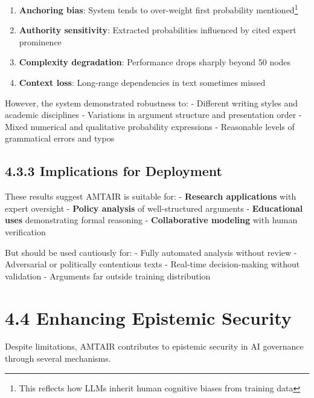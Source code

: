 \documentclass[
  11pt,
  letterpaper,
]{book}
\providecommand{\tightlist}{%
  \setlength{\itemsep}{0pt}\setlength{\parskip}{0pt}}
\begin{document}
\begin{enumerate}
\def\labelenumi{\arabic{enumi}.}
\tightlist
\item
  \textbf{Anchoring bias}: System tends to over-weight first probability
  mentioned\footnote{This reflects how LLMs inherit human cognitive
    biases from training data}
\item
  \textbf{Authority sensitivity}: Extracted probabilities influenced by
  cited expert prominence
\item
  \textbf{Complexity degradation}: Performance drops sharply beyond 50
  nodes
\item
  \textbf{Context loss}: Long-range dependencies in text sometimes
  missed
\end{enumerate}

However, the system demonstrated robustness to: - Different writing
styles and academic disciplines - Variations in argument structure and
presentation order - Mixed numerical and qualitative probability
expressions - Reasonable levels of grammatical errors and typos

\subsection*{4.3.3 Implications for
Deployment}\label{sec-deployment-implications}

These results suggest AMTAIR is suitable for: - \textbf{Research
applications} with expert oversight - \textbf{Policy analysis} of
well-structured arguments - \textbf{Educational uses} demonstrating
formal reasoning - \textbf{Collaborative modeling} with human
verification

But should be used cautiously for: - Fully automated analysis without
review - Adversarial or politically contentious texts - Real-time
decision-making without validation - Arguments far outside training
distribution

\section*{4.4 Enhancing Epistemic
Security}\label{sec-epistemic-security}


Despite limitations, AMTAIR contributes to epistemic security in AI
governance through several mechanisms.
\end{document}
